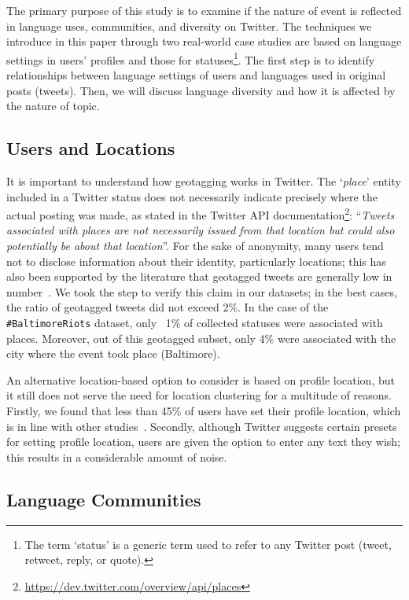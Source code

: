 \documentclass{llncs}
\begin{document}
The primary purpose of this study is to examine if the nature of event
is reflected in language uses, communities, and diversity on
Twitter. The techniques we introduce in this paper through two
real-world case studies are based on language settings in users'
profiles and those for statuses\footnote{The term `status' is a
generic term used to refer to any Twitter post (tweet, retweet, reply,
or quote).}.  The first step is to identify relationships between
language settings of users and languages used in original posts
(tweets). Then, we will discuss language diversity and how it is
affected by the nature of topic.

\subsection{Users and Locations}

It is important to understand how geotagging works in Twitter. The
`{\emph{place}}' entity included in a Twitter status does not
necessarily indicate precisely where the actual posting was made, as
stated in the Twitter API
documentation\footnote{\url{https://dev.twitter.com/overview/api/places}}:
``{\emph{Tweets associated with places are not necessarily issued from
that location but could also potentially be about that
location}}''. For the sake of anonymity, many users tend not to
disclose information about their identity, particularly locations;
this has also been supported by the literature that geotagged tweets
are generally low in number~\cite{kang-et-al:2013}. We took the step
to verify this claim in our datasets; in the best cases, the ratio of
geotagged tweets did not exceed 2\%. In the case of the
{\texttt{\#BaltimoreRiots}} dataset, only ~1\% of collected statuses
were associated with places. Moreover, out of this geotagged subset,
only 4\% were associated with the city where the event took place
(Baltimore).

An alternative location-based option to consider is based on profile
location, but it still does not serve the need for location clustering
for a multitude of reasons. Firstly, we found that less than 45\% of
users have set their profile location, which is in line with other
studies~\cite{graham-et-al:2014}. Secondly, although Twitter suggests
certain presets for setting profile location, users are given the
option to enter any text they wish; this results in a considerable
amount of noise.

\subsection{Language Communities}\label{langcomm}
\end{document}
